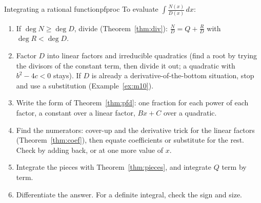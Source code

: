 \documentclass[11pt]{article}
\begin{document}
\begin{proc}{Integrating a rational function}{pfproc}
To evaluate $\int\frac{N(x)}{D(x)}\,dx$:
\begin{enumerate}[nosep]
  \item If $\deg N\ge\deg D$, divide (Theorem~\ref{thm:div}): $\frac ND=Q+\frac RD$ with $\deg R<\deg D$.
  \item Factor $D$ into linear factors and irreducible quadratics (find a root by trying the divisors of the constant term, then divide it out; a quadratic with $b^2-4c<0$ stays). If $D$ is already a derivative-of-the-bottom situation, stop and use a substitution (Example~\ref{ex:m10}).
  \item Write the form of Theorem~\ref{thm:pfd}: one fraction for each power of each factor, a constant over a linear factor, $Bx+C$ over a quadratic.
  \item Find the numerators: cover-up and the derivative trick for the linear factors (Theorem~\ref{thm:coef}), then equate coefficients or substitute for the rest. Check by adding back, or at one more value of $x$.
  \item Integrate the pieces with Theorem~\ref{thm:pieces}, and integrate $Q$ term by term.
  \item Differentiate the answer. For a definite integral, check the sign and size.
\end{enumerate}
\end{proc}
\end{document}
